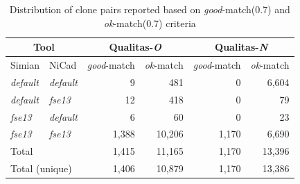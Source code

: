 \documentclass{IEEEtran}
\begin{document}
\begin{table}[H]
	\centering
	\caption{Distribution of clone pairs reported based on \textit{good}-match(0.7) and \textit{ok}-match(0.7) criteria}
	\label{t_agreed_good_clone_pairs}
	\begin{tabular}{l|l|r|r|r|r}
		\hline
		\multicolumn{2}{c|}{Tool} & \multicolumn{2}{c|}{Qualitas-\textit{O}} & \multicolumn{2}{c}{Qualitas-\textit{N}} \\
		\hline
		Simian & NiCad & \textit{good}-match & \textit{ok}-match & \textit{good}-match & \textit{ok}-match \\
		\hline
		\textit{default} & \textit{default} & 9 	& 481 	& 0 & 6,604 \\ 
		\textit{default} & \textit{fse13} 	& 12 	& 418 	& 0 & 79 \\ 
		\textit{fse13} 	& \textit{default} 	& 6 	& 60 	& 0 & 23 \\
		\textit{fse13} 	& \textit{fse13} 	& 1,388 & 10,206 & 1,170 & 6,690 \\ 
		\hline
		\multicolumn{2}{l|}{Total} & 1,415 & 11,165 & 1,170 & 13,396 \\
		\multicolumn{2}{l|}{Total (unique)} & 1,406 & 10,879 & 1,170 & 13,386 \\
		\hline
	\end{tabular}
\end{table}
\end{document}
